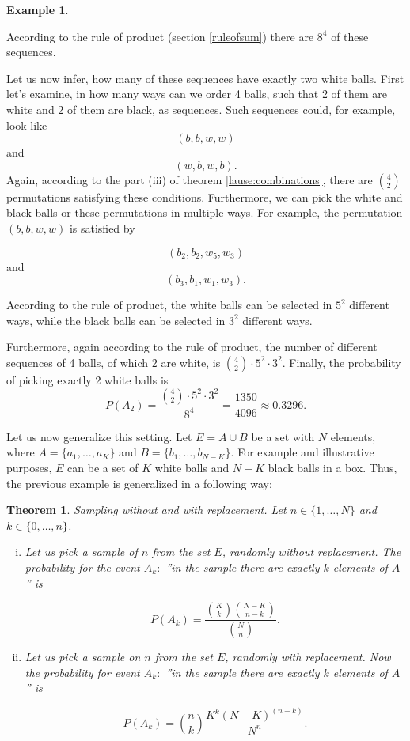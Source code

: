 \documentclass[12pt,a4paper,leqno]{report}
\theoremstyle{plain}
\newtheorem{lause}[equation]{Theorem}
\theoremstyle{definition}
\newtheorem{esim}[equation]{Example}
\begin{document}
\begin{esim}
\begin{enumerate}[(i)]
According to the rule of product (section \ref{ruleofsum}) there are $8^4$ of these sequences. 

Let us now infer, how many of these sequences have exactly two white balls. First let's examine, in how many ways can we order 4 balls, such that 2 of them are white and 2 of them are black, as sequences. Such sequences could, for example, look like
\[
(b, b, w, w)
\]
and
\[
(w, b, w, b).
\]
Again, according to the part (iii) of theorem  \ref{lause:combinations}, there are $\binom{4}{2}$ permutations satisfying these conditions. Furthermore, we can pick the white and black balls or these permutations in multiple ways. For example, the permutation $(b, b, w, w)$ is satisfied by

\[
(b_2, b_2, w_5, w_3)
\]
and
\[
(b_3, b_1, w_1, w_3).
\]

According to the rule of product, the white balls can be selected in $5^2$ different ways, while the black balls can be selected in $3^2$ different ways.

Furthermore, again according to the rule of product, the number of different sequences of 4 balls, of which 2 are white, is $\binom{4}{2} \cdot 5^2 \cdot 3^2$. Finally, the probability of picking exactly 2 white balls is
\[
P(A_2) = \frac{\binom{4}{2} \cdot 5^2 \cdot 3^2}{8^4} = \frac{1350}{4096} \approx 0.3296.
\]

\end{enumerate}
\end{esim}

\bigskip

Let us now generalize this setting. Let  $E = A \cup B$ be a set with $N$ elements, where $A = \{a_1, \dots, a_K\}$ and $B =\{b_1,\dots,  b_{N-K}\}$. For example and illustrative purposes, $E$ can be a set of $K$ white balls and $N-K$ black balls in a box. Thus, the previous example is generalized in a following way:

\begin{lause}
\label{lause:sampling} Sampling without and with replacement. Let $n\in \{1, \dots , N\}$ and $k \in \{0, \dots , n\}$. 

\begin{enumerate}[(i)]
\item {}
Let us pick a sample of $n$ from the set $E$, randomly without replacement. The probability for the event $A_k:$ ''in the sample there are exactly $k$ elements of $A$'' is

\[
P(A_k) = \frac{\binom{K}{k}\binom{N-K}{n-k}}{\binom{N}{n}}.
\]

\item {}
Let us pick a sample on $n$ from the set $E$, randomly with replacement. Now the probability for event $A_k:$ ''in the sample there are exactly $k$ elements of $A$'' is

\[
P(A_k) = \binom{n}{k} \frac{K^k(N-K)^{(n-k)}}{N^n}.
\]

\end{enumerate} 
\end{lause}
\end{document}
